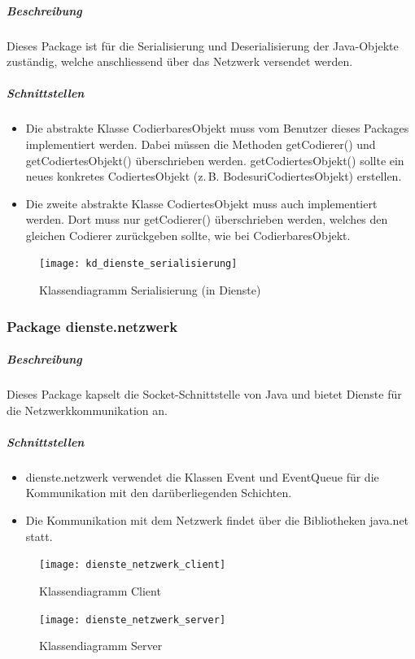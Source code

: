 \documentclass[12pt,halfparskip]{scrartcl}
\begin{document}
\subparagraph{Beschreibung}
Dieses Package ist für die Serialisierung und Deserialisierung der Java-Objekte zuständig, welche anschliessend über das Netzwerk versendet werden.

\subparagraph{Schnittstellen}
\begin{itemize}
	\item Die abstrakte Klasse CodierbaresObjekt muss vom Benutzer dieses Packages implementiert werden. Dabei müssen die Methoden getCodierer() und getCodiertesObjekt() überschrieben werden. getCodiertesObjekt() sollte ein neues konkretes CodiertesObjekt (z.\,B. BodesuriCodiertesObjekt) erstellen.
	\item Die zweite abstrakte Klasse CodiertesObjekt muss auch implementiert werden. Dort muss nur getCodierer() überschrieben werden, welches den gleichen Codierer zurückgeben sollte, wie bei CodierbaresObjekt.
\end{itemize}

\begin{figure}[h]
	\centering
	\texttt{[image: kd\_dienste\_serialisierung]}
	\caption{Klassendiagramm Serialisierung (in Dienste)}
	\label{fig:kd_dienste_serialisierung}
\end{figure}

\clearpage
\subsubsection{Package dienste.netzwerk} %
\label{ssub:package_dienste_netzwerk}
\subparagraph{Beschreibung}
Dieses Package kapselt die Socket-Schnittstelle von Java und bietet Dienste für die Netzwerkkommunikation an.

\subparagraph{Schnittstellen} %
\label{ssub:schnittstellen}
\begin{itemize}
	\item dienste.netzwerk verwendet die Klassen Event und EventQueue für die Kommunikation mit den darüberliegenden Schichten.
	\item Die Kommunikation mit dem Netzwerk findet über die Bibliotheken java.net statt.
\end{itemize}

\begin{figure}[h]
	\centering
	\texttt{[image: dienste\_netzwerk\_client]}
	\caption{Klassendiagramm Client}
	\label{fig:dienste_netzwerk_client}
\end{figure}

\begin{figure}[h]
	\centering
	\texttt{[image: dienste\_netzwerk\_server]}
	\caption{Klassendiagramm Server}
	\label{fig:dienste_netzwerk_server}
\end{figure}
\end{document}
